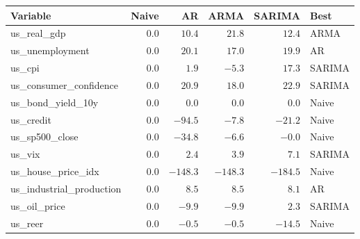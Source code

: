 \begin{tabular}{lrrrrl}
  \toprule
  Variable & Naive & AR & ARMA & SARIMA & Best \\
  \midrule
  us\_real\_gdp & $0.0$ & $10.4$ & $21.8$ & $12.4$ & ARMA \\
  us\_unemployment & $0.0$ & $20.1$ & $17.0$ & $19.9$ & AR \\
  us\_cpi & $0.0$ & $1.9$ & $-5.3$ & $17.3$ & SARIMA \\
  us\_consumer\_confidence & $0.0$ & $20.9$ & $18.0$ & $22.9$ & SARIMA \\
  us\_bond\_yield\_10y & $0.0$ & $0.0$ & $0.0$ & $0.0$ & Naive \\
  us\_credit & $0.0$ & $-94.5$ & $-7.8$ & $-21.2$ & Naive \\
  us\_sp500\_close & $0.0$ & $-34.8$ & $-6.6$ & $-0.0$ & Naive \\
  us\_vix & $0.0$ & $2.4$ & $3.9$ & $7.1$ & SARIMA \\
  us\_house\_price\_idx & $0.0$ & $-148.3$ & $-148.3$ & $-184.5$ & Naive \\
  us\_industrial\_production & $0.0$ & $8.5$ & $8.5$ & $8.1$ & AR \\
  us\_oil\_price & $0.0$ & $-9.9$ & $-9.9$ & $2.3$ & SARIMA \\
  us\_reer & $0.0$ & $-0.5$ & $-0.5$ & $-14.5$ & Naive \\
  \bottomrule
\end{tabular}